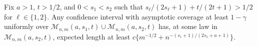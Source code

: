 Fix \(a>1\), \(t>1/2\), and \(0<s_1<s_2\) such that \(s_\ell/(2s_\ell+1)+t/(2t+1)>1/2\) for \(\ell\in\{1,2\}\). Any confidence interval with asymptotic coverage at least \(1-\gamma\) uniformly over \(\mathcal M_{n,m}(a,s_1,t)\cup\mathcal M_{n,m}(a,s_2,t)\) has, at some law in \(\mathcal M_{n,m}(a,s_2,t)\), expected length at least \(c\{m^{-1/2}+n^{-(s_1+1)/(2s_1+a+1)}\}\).